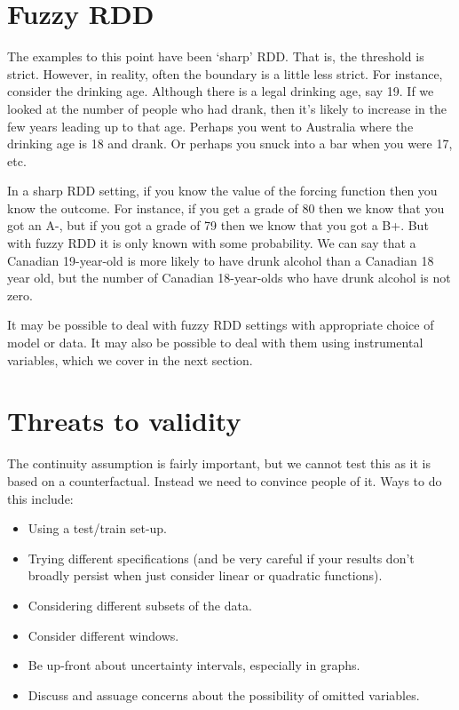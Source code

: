 \documentclass[
]{book}
\providecommand{\tightlist}{%
  \setlength{\itemsep}{0pt}\setlength{\parskip}{0pt}}
\begin{document}
\hypertarget{fuzzy-rdd}{%
\section{Fuzzy RDD}\label{fuzzy-rdd}}

The examples to this point have been `sharp' RDD. That is, the threshold is strict. However, in reality, often the boundary is a little less strict. For instance, consider the drinking age. Although there is a legal drinking age, say 19. If we looked at the number of people who had drank, then it's likely to increase in the few years leading up to that age. Perhaps you went to Australia where the drinking age is 18 and drank. Or perhaps you snuck into a bar when you were 17, etc.

In a sharp RDD setting, if you know the value of the forcing function then you know the outcome. For instance, if you get a grade of 80 then we know that you got an A-, but if you got a grade of 79 then we know that you got a B+. But with fuzzy RDD it is only known with some probability. We can say that a Canadian 19-year-old is more likely to have drunk alcohol than a Canadian 18 year old, but the number of Canadian 18-year-olds who have drunk alcohol is not zero.

It may be possible to deal with fuzzy RDD settings with appropriate choice of model or data. It may also be possible to deal with them using instrumental variables, which we cover in the next section.

\hypertarget{threats-to-validity}{%
\section{Threats to validity}\label{threats-to-validity}}

The continuity assumption is fairly important, but we cannot test this as it is based on a counterfactual. Instead we need to convince people of it. Ways to do this include:

\begin{itemize}
\tightlist
\item
  Using a test/train set-up.
\item
  Trying different specifications (and be very careful if your results don't broadly persist when just consider linear or quadratic functions).
\item
  Considering different subsets of the data.
\item
  Consider different windows.
\item
  Be up-front about uncertainty intervals, especially in graphs.
\item
  Discuss and assuage concerns about the possibility of omitted variables.
\end{itemize}
\end{document}
